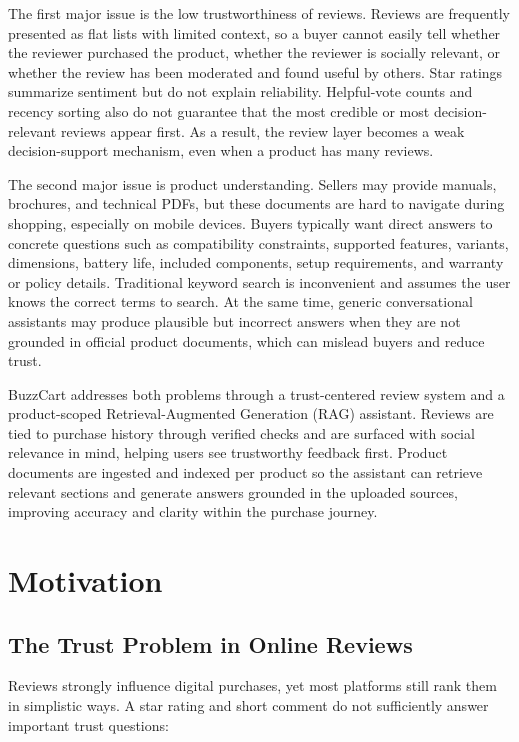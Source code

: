 \documentclass[12pt,letterpaper]{report}
\begin{document}
The first major issue is the low trustworthiness of reviews. Reviews are frequently presented as flat lists with limited context, so a buyer cannot easily tell whether the reviewer purchased the product, whether the reviewer is socially relevant, or whether the review has been moderated and found useful by others. Star ratings summarize sentiment but do not explain reliability. Helpful-vote counts and recency sorting also do not guarantee that the most credible or most decision-relevant reviews appear first. As a result, the review layer becomes a weak decision-support mechanism, even when a product has many reviews.

The second major issue is product understanding. Sellers may provide manuals, brochures, and technical PDFs, but these documents are hard to navigate during shopping, especially on mobile devices. Buyers typically want direct answers to concrete questions such as compatibility constraints, supported features, variants, dimensions, battery life, included components, setup requirements, and warranty or policy details. Traditional keyword search is inconvenient and assumes the user knows the correct terms to search. At the same time, generic conversational assistants may produce plausible but incorrect answers when they are not grounded in official product documents, which can mislead buyers and reduce trust.

BuzzCart addresses both problems through a trust-centered review system and a product-scoped Retrieval-Augmented Generation (RAG) assistant. Reviews are tied to purchase history through verified checks and are surfaced with social relevance in mind, helping users see trustworthy feedback first. Product documents are ingested and indexed per product so the assistant can retrieve relevant sections and generate answers grounded in the uploaded sources, improving accuracy and clarity within the purchase journey.

\chapter{Motivation}

\section{The Trust Problem in Online Reviews}

Reviews strongly influence digital purchases, yet most platforms still rank them in simplistic ways. A star rating and short comment do not sufficiently answer important trust questions:
\end{document}
